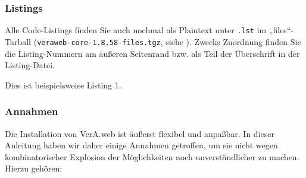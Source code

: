 \documentclass{tarentanleitung}
\newcommand{\vwiaverssw}{1.8.58}
\begin{document}
\subsubsection{Listings}\label{subsubsec:aboutmanual-lst}

\begin{minipage}{\linewidth}
Alle Code-Listings finden Sie auch nochmal als Plaintext unter
\texttt{\jobname.lst} im „files“-Tarball
(\texttt{veraweb-core-\vwiaverssw{}-files.tgz}, siehe
).
Zwecks Zuordnung finden Sie die Listing-Nummern am äußeren
Seitenrand bzw. als Teil der Überschrift in der Listing-Datei.

\begin{lstdumpx}
Dies ist beispielsweise Listing 1.
\end{lstdumpx}
\end{minipage}

\subsubsection{Annahmen}\label{subsubsec:aboutmanual-assume}

Die Installation von VerA.web ist äußerst flexibel und anpaßbar.
In dieser Anleitung haben wir daher einige Annahmen getroffen, um
sie nicht wegen kombinatorischer Explosion der Möglichkeiten noch
unverständlicher zu machen. Hierzu gehören:\keinumbruch
\end{document}
